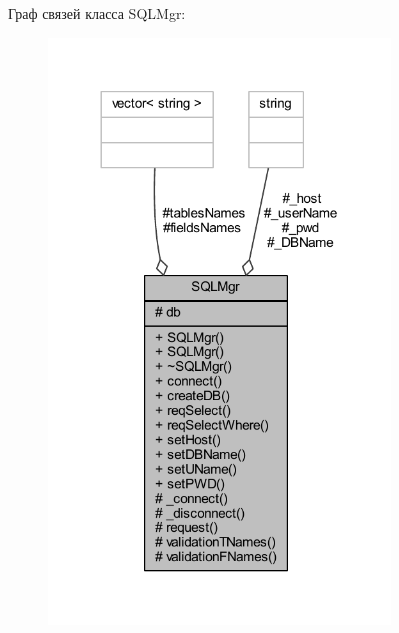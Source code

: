 Граф связей класса S\+Q\+L\+Mgr\+:\nopagebreak
\begin{figure}[H]
\begin{center}
\leavevmode
\includegraphics[width=257pt]{d5/dfe/class_s_q_l_mgr__coll__graph}
\end{center}
\end{figure}
